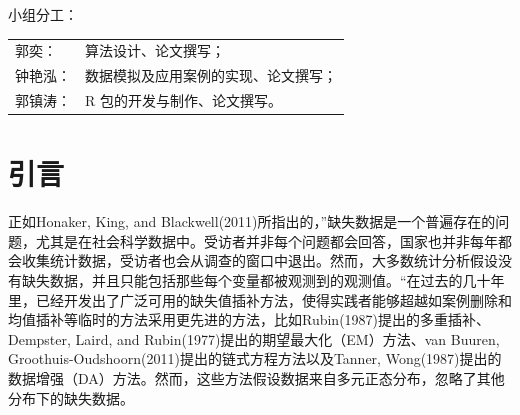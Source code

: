 \documentclass[12pt,hyperref,a4paper,UTF8]{ctexart}
\begin{document}
\cover
\thispagestyle{empty}
{ 小组分工：\par}
\vspace{0.25cm}
\begin{tabular}{ll}
    郭奕： & 算法设计、论文撰写； \\ 
    钟艳泓： & 数据模拟及应用案例的实现、论文撰写； \\ 
    郭镇涛： & R 包的开发与制作、论文撰写。 \\
\end{tabular}
\newpage
\begin{abstract}
    本文提供了通过期望最大化（EM）算法和数据增强（DA）算法提供了较为高效和准确的处理分类变量数据集缺失问题的实用方法。算法的设计与实现中特别考虑到了贝叶斯方法的集成，允许自定义与数据相关的先验参数或者非信息性先验，以适应不同类型的数据和问题背景。为了提高计算速度，我们在进行分类变量的匹配和多项式分布的汇总统计中采用了基于\texttt{Rcpp}中的哈希表（Hash Table）。在本文中我们介绍该方法的实现原理，并结合R包给出使用指南和应用场景。最后，为了与其他常见的插补包（如\textbf{mice}包和\textbf{Amelia}包）进行对比，本文对模拟的3种缺失模式的数据分别用不同的包进行插补比较插补速度和准确性，结果表明基于本方法开发的\textbf{MissCat}包在速度上逊于部分成熟的插补包，但在准确性上却出人意料地优于\textbf{mice}包和\textbf{Amelia}包，展示了本R包是处理大规模复杂缺失数据问题的一个有力工具。
    \par\textbf{关键词：}多项分布；Dirichlet分布；插补；EM算法；DA算法 
\end{abstract}
\thispagestyle{empty} %

\newpage
{}
\setcounter{page}{1}
\tableofcontents

\newpage
\setcounter{page}{1}



\section{引言}
正如Honaker, King, and Blackwell(2011)所指出的，”缺失数据是一个普遍存在的问题，尤其是在社会科学数据中。受访者并非每个问题都会回答，国家也并非每年都会收集统计数据，受访者也会从调查的窗口中退出。然而，大多数统计分析假设没有缺失数据，并且只能包括那些每个变量都被观测到的观测值。“在过去的几十年里，已经开发出了广泛可用的缺失值插补方法，使得实践者能够超越如案例删除和均值插补等临时的方法采用更先进的方法，比如Rubin(1987)提出的多重插补、Dempster, Laird, and Rubin(1977)提出的期望最大化（EM）方法、van Buuren, Groothuis-Oudshoorn(2011)提出的链式方程方法以及Tanner, Wong(1987)提出的数据增强（DA）方法。然而，这些方法假设数据来自多元正态分布，忽略了其他分布下的缺失数据。
\end{document}
